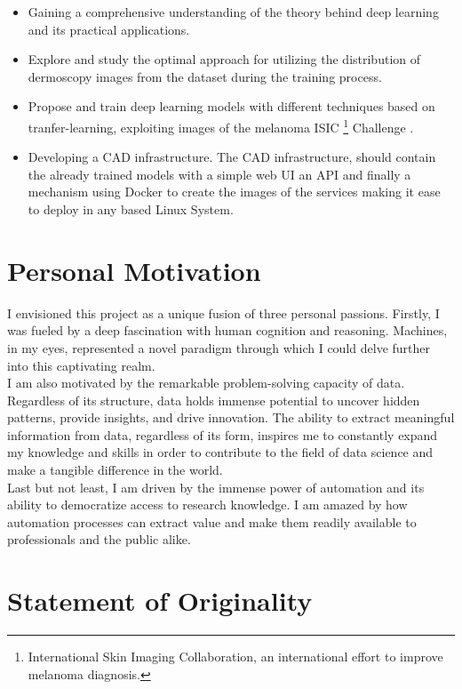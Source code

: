\begin{itemize}
  \item Gaining a comprehensive understanding of the theory
    behind deep learning and its practical applications.
  \item Explore and study the optimal approach for utilizing the distribution
    of dermoscopy images from the dataset during the training process.
  \item Propose and train
    deep learning models with different techniques based on tranfer-learning,
    exploiting images of the melanoma ISIC \footnote{International Skin Imaging
    Collaboration, an international effort to improve melanoma diagnosis.}
    Challenge \cite{IsicChallenge}.
  \item Developing a CAD infrastructure. The CAD infrastructure, should contain
    the already trained models with a simple web UI an API and finally a
    mechanism using Docker to create the images of the services making it ease
    to deploy in any based Linux System.
\end{itemize}

\section{Personal Motivation}

I envisioned this project as a unique fusion of three personal passions.
Firstly, I was fueled by a deep fascination with human cognition and reasoning.
Machines, in my eyes, represented a novel paradigm through which I could delve
further into this captivating realm. \\

I am also motivated by the remarkable problem-solving capacity of data.
Regardless of its structure, data holds immense potential to uncover hidden
patterns, provide insights, and drive innovation. The ability to extract
meaningful information from data, regardless of its form, inspires me to
constantly expand my knowledge and skills in order to contribute to the field
of data science and make a tangible difference in the world. \\

Last but not least, I am driven by the immense power of automation and its
ability to democratize access to research knowledge. I am amazed by how
automation processes can extract value and make them readily available to
professionals and the public alike.

\section{Statement of Originality}

